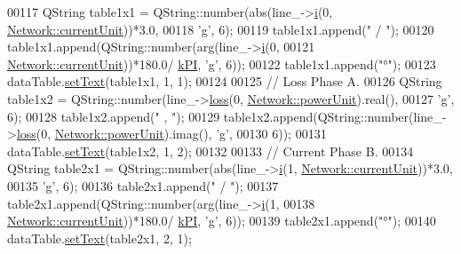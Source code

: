 \begin{DoxyCode}
00117   QString table1x1 = QString::number(abs(line\_->\hyperlink{group___models_ga2ad899adaa4f2e25b38c58e076db94ea}{i}(0, \hyperlink{group___models_gac6a26db5fef2b1dd2a00faf6340d1702}{Network::currentUnit}))*3.0,
00118                                      \textcolor{charliteral}{'g'}, 6);
00119   table1x1.append(\textcolor{stringliteral}{" / "});
00120   table1x1.append(QString::number(arg(line\_->\hyperlink{group___models_ga2ad899adaa4f2e25b38c58e076db94ea}{i}(0,
00121                                       \hyperlink{group___models_gac6a26db5fef2b1dd2a00faf6340d1702}{Network::currentUnit}))*180.0/
      \hyperlink{math__constants_8h_a368d99984512d9a6c6f18b37b4446431}{kPI}, \textcolor{charliteral}{'g'}, 6));
00122   table1x1.append(\textcolor{stringliteral}{"°"});
00123   dataTable.\hyperlink{class_data_table_aee0d28c77116b51360f0124a529cb3ff}{setText}(table1x1, 1, 1);
00124 
00125   \textcolor{comment}{// Loss Phase A.}
00126   QString table1x2 = QString::number(line\_->\hyperlink{group___models_ga511d4e89d613d4f222480476f2da3abe}{loss}(0, \hyperlink{group___models_ga9504015bc566f4a3d3b4d4a86000293b}{Network::powerUnit}).real(),
00127                                      \textcolor{charliteral}{'g'}, 6);
00128   table1x2.append(\textcolor{stringliteral}{" , "});
00129   table1x2.append(QString::number(line\_->\hyperlink{group___models_ga511d4e89d613d4f222480476f2da3abe}{loss}(0, \hyperlink{group___models_ga9504015bc566f4a3d3b4d4a86000293b}{Network::powerUnit}).imag(), \textcolor{charliteral}{'g'},
00130                                   6));
00131   dataTable.\hyperlink{class_data_table_aee0d28c77116b51360f0124a529cb3ff}{setText}(table1x2, 1, 2);
00132 
00133   \textcolor{comment}{// Current Phase B.}
00134   QString table2x1 = QString::number(abs(line\_->\hyperlink{group___models_ga2ad899adaa4f2e25b38c58e076db94ea}{i}(1, \hyperlink{group___models_gac6a26db5fef2b1dd2a00faf6340d1702}{Network::currentUnit}))*3.0,
00135                                      \textcolor{charliteral}{'g'}, 6);
00136   table2x1.append(\textcolor{stringliteral}{" / "});
00137   table2x1.append(QString::number(arg(line\_->\hyperlink{group___models_ga2ad899adaa4f2e25b38c58e076db94ea}{i}(1,
00138                                       \hyperlink{group___models_gac6a26db5fef2b1dd2a00faf6340d1702}{Network::currentUnit}))*180.0/
      \hyperlink{math__constants_8h_a368d99984512d9a6c6f18b37b4446431}{kPI}, \textcolor{charliteral}{'g'}, 6));
00139   table2x1.append(\textcolor{stringliteral}{"°"});
00140   dataTable.\hyperlink{class_data_table_aee0d28c77116b51360f0124a529cb3ff}{setText}(table2x1, 2, 1);

\end{DoxyCode}
